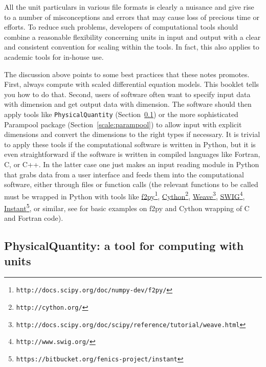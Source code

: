 \documentclass[graybox,envcountchap,sectrefs,final]{svmonodo}
\begin{document}
All the unit particulars in various file formats is clearly a nuisance
and give rise to a number of misconceptions and errors that may cause
loss of precious time or efforts. To reduce such problems, developers
of computational tools should combine a reasonable flexibility
concerning units in input and output with a clear and consistent
convention for scaling within the tools. In fact, this also applies to
academic tools for in-house use.

The discussion above points to some best practices that these notes
promotes. First, always compute with scaled differential equation
models. This booklet tells you how to do that. Second, users of software
often want to specify input data with dimension and get output data
with dimension. The software should then apply tools like
\texttt{PhysicalQuantity} (Section~\ref{scale:PQ})
or the more sophisticated Parampool package (Section~\ref{scale:parampool}) to allow input with explicit dimensions and
convert the dimensions to the right types if necessary.
It is trivial to apply these tools if the computational software is
written in Python, but it is even straightforward if the software is
written in compiled languages like Fortran, C, or C++. In the latter
case one just makes an input reading module in Python that grabs data from
a user interface and feeds them into the computational software, either
through files or function calls (the relevant functions to be called
must be wrapped in Python with tools like
\href{{http://docs.scipy.org/doc/numpy-dev/f2py/}}{f2py}\footnote{\texttt{http://docs.scipy.org/doc/numpy-dev/f2py/}},
\href{{http://cython.org/}}{Cython}\footnote{\texttt{http://cython.org/}},
\href{{http://docs.scipy.org/doc/scipy/reference/tutorial/weave.html}}{Weave}\footnote{\texttt{http://docs.scipy.org/doc/scipy/reference/tutorial/weave.html}},
\href{{http://www.swig.org/}}{SWIG}\footnote{\texttt{http://www.swig.org/}},
\href{{https://bitbucket.org/fenics-project/instant}}{Instant}\footnote{\texttt{https://bitbucket.org/fenics-project/instant}},
or similar, see \cite[Appendix C]{Langtangen_Linge_fdm} for basic
examples on f2py and Cython wrapping of C and Fortran code).

\subsection{PhysicalQuantity: a tool for computing with units}
\label{scale:PQ}

\end{document}
